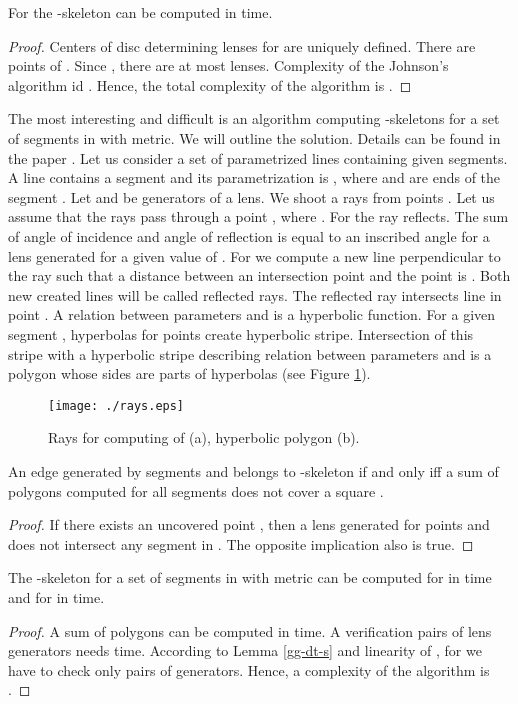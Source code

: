 \documentclass[11pt]{llncs}
\begin{document}
\begin{corollary}
For  the -skeleton  can be computed in  time.
\end{corollary}
\begin{proof}
Centers of disc determining lenses for  are uniquely defined. There are points of .
Since , there are at most  lenses. Complexity of the Johnson's algorithm
id . Hence, the total complexity of the algorithm is .   
\end{proof}


The most interesting and difficult is an algorithm computing -skeletons for a set 
of  segments in  with  metric. We will outline the solution. 
Details can be found in the paper \cite{km14}.
Let us consider a set of parametrized lines containing given segments. A line 
contains a segment  and its parametrization is 
, where  and  are
ends of the segment . Let  and  be generators of a lens.
We shoot a rays from points . Let us assume that the rays pass through
a point , where .
For  the ray reflects. The sum of angle of incidence and angle of reflection 
is equal to an inscribed angle for a lens generated for a given value of .
For  we compute a new line perpendicular to the ray such that 
a distance between an intersection point  and the point  is 
.
Both new created lines will be called reflected rays.
The reflected ray intersects line  in point .
A relation between parameters  and  is a hyperbolic function.
For a given segment , hyperbolas for points 
create hyperbolic stripe. Intersection of this stripe with a hyperbolic stripe describing relation
between parameters  and  is a polygon whose sides are parts of hyperbolas 
(see Figure \ref{fig:rays}). 

\begin{figure}[htbp]
\centering
\texttt{[image: ./rays.eps]}
\caption{Rays for computing of  (a), hyperbolic polygon (b).}
\label{fig:rays}
\end{figure}   

\begin{theorem}
An edge generated by segments  and  belongs to -skeleton 
if and only iff a sum of polygons computed for all segments 
does not cover a square . 
\end{theorem}
\begin{proof}
If there exists an uncovered point , then a lens generated 
for points  and  does not intersect any segment in .
The opposite implication also is true.
\end{proof}

 
\begin{theorem}
The -skeleton  for a set of  segments  in  with  metric
can be computed for  in  time and for  in 
time.
\end{theorem}
\begin{proof}
A sum of  polygons can be computed in  time. A verification  pairs 
of lens generators needs  time.
According to Lemma \ref{gg-dt-s} and linearity of , for 
we have to check only  pairs of generators. Hence, a complexity of the algorithm
is . 
\end{proof}
\end{document}
